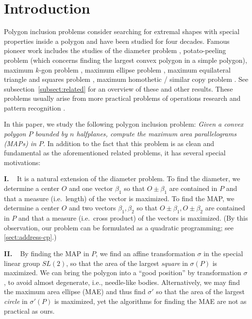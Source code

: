 \documentclass{ws-ijcga}
\begin{document}
\section{Introduction}\label{sect:introduction}


Polygon inclusion problems consider searching for extremal shapes with special properties inside a polygon and have been studied for four decades.
Famous pioneer work includes the studies of the diameter problem \cite{Classic-shamosCG-dissertation},
  potato-peeling problem \cite{Potato-polynomial-DCG86} (which concerns finding the largest convex polygon in a simple polygon),
  maximum $k$-gon problem \cite{Kgon-extremal-STOC82},
  maximum ellipse problem \cite{ellipse-LPtype-SCG92},
  maximum equilateral triangle and squares problem \cite{Othershape-square-Allerton87},
  maximum homothetic / similar copy problem \cite{Placement-chazelle-CR83,Placement-ST-CGTA94,Placement-convex-DCG98}.
  See subsection~\ref{subsect:related} for an overview of these and other results.
  These problems usually arise from more practical problems of operations research and pattern recognition \cite{ShapeSurvey}. \smallskip

In this paper, we study the following polygon inclusion problem:
  \emph{Given a convex polygon $P$ bounded by $n$ halfplanes, compute the maximum area parallelograms (MAPs) in $P$.}
In addition to the fact that this problem is as clean and fundamental as the aforementioned related problems, it has several special motivations:

\smallskip \noindent\textbf{I.} \mbox{  } It is a natural extension of the diameter problem.
  To find the diameter, we determine a center $O$ and one vector $\beta_1$ so that $O\pm \beta_1$ are contained in $P$
    and that a measure (i.e.\ length) of the vector is maximized.
  To find the MAP, we determine a center $O$ and two vectors $\beta_1,\beta_2$ so that $O\pm \beta_1,O\pm \beta_2$ are contained in $P$
    and that a measure (i.e.\ cross product) of the vectors is maximized.
    (By this observation, our problem can be formulated as a quadratic programming; see \ref{sect:address-cp}.)\smallskip

\smallskip \noindent\textbf{II.} \mbox{  } By finding the MAP in $P$, we find an affine transformation $\sigma$ in the special linear group $SL(2)$,
    so that the area of the largest \emph{square} in $\sigma(P)$ is maximized.
    We can bring the polygon into a ``good position'' by transformation $\sigma$, to avoid almost degenerate, i.e., needle-like bodies.
    Alternatively, we may find the maximum area ellipse (MAE) and thus find $\sigma'$ so that the area of the largest \emph{circle} in $\sigma'(P)$ is maximized,
    yet the algorithms for finding the MAE are not as practical as ours.\smallskip
\end{document}
